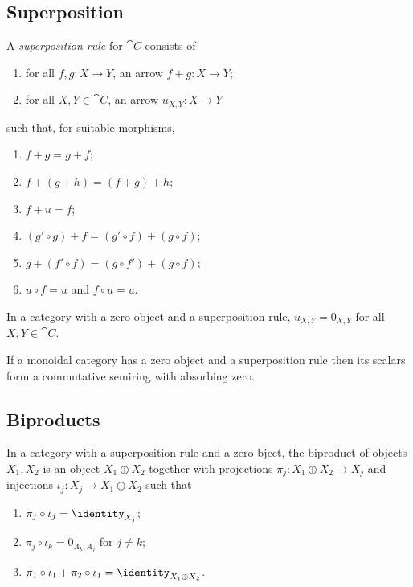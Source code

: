 \documentclass{article}
\begin{document}
\subsection{Superposition}

\begin{definition}
  A \emph{superposition rule} for $\cat{C}$ consists of
  \begin{enumerate}
    \item for all $f,g:X\to Y$, an arrow $f+g:X\to Y$;
    \item for all $X,Y\in\cat{C}$, an arrow $u_{X,Y}:X\to Y$
  \end{enumerate}
  such that, for suitable morphisms,
  \begin{enumerate}
    \item $f+g=g+f$;
    \item $f+(g+h)=(f+g)+h$;
    \item $f+u = f$;
    \item $(g'\circ g)+f=(g'\circ f)+(g\circ f)$;
    \item $g+(f'\circ f) = (g\circ f')+(g\circ f)$;
    \item $u\circ f = u$ and $f\circ u = u$.
  \end{enumerate}
\end{definition}

\begin{lemma}
  In a category with a zero object and a superposition rule, $u_{X,Y}=0_{X,Y}$ for
  all $X,Y\in\cat{C}$.
\end{lemma}

\begin{lemma}
  If a monoidal category has a zero object and a superposition rule then its scalars
  form a commutative semiring with absorbing zero.
\end{lemma}

\subsection{Biproducts}

\begin{definition}
  In a category with a superposition rule and a zero bject, the biproduct
  of objects $X_1,X_2$ is an object $X_1\oplus X_2$ together with projections
  $\pi_j : X_1\oplus X_2\to X_j$ and injections $\iota_j :X_j\to X_1\oplus X_2$
  such that
  \begin{enumerate}
    \item $\pi_j\circ\iota_j = \identity_{X_j}$;
    \item $\pi_j\circ\iota_{k} = 0_{A_k,A_j}$ for $j\neq k$;
    \item $\pi_1\circ\iota_1 + \pi_2\circ\iota_1 = \identity_{X_1\oplus X_2}$.
  \end{enumerate}
\end{definition}
\end{document}
